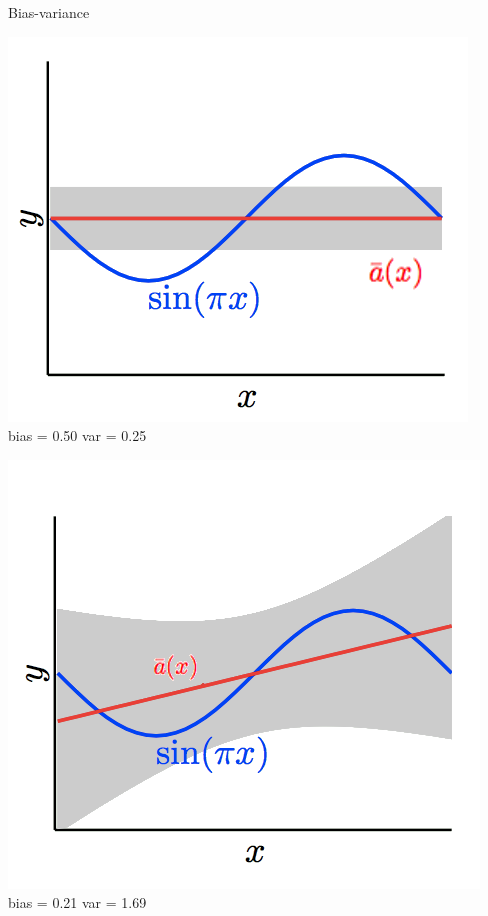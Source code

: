 \documentclass[10pt]{beamer}
\begin{document}
\begin{frame}{Bias-variance }
  \centering
  \begin{minipage}[b]{.45\textwidth}
    \includegraphics[width=\textwidth, keepaspectratio]{images/sin31} \\
    \centering
    bias = 0.50 \qquad var = 0.25
  \end{minipage}\qquad
  \pause
  \begin{minipage}[b]{.45\textwidth}
    \includegraphics[width=\textwidth, keepaspectratio]{images/sin41}\\
    \centering
    bias = 0.21 \qquad var = 1.69
  \end{minipage}
\end{frame}
\end{document}
